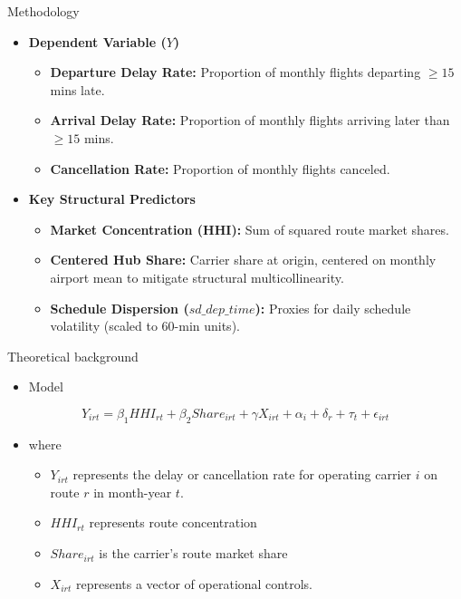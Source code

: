 \documentclass[t]{beamer}
\begin{document}
\begin{frame}{Methodology} %

    \begin{itemize}
        \item \textbf{Dependent Variable ($Y$)}
        \begin{itemize}
            \item \textbf{Departure Delay Rate:} Proportion of monthly flights departing $\geq 15$ mins late.
            \item \textbf{Arrival Delay Rate:} Proportion of monthly flights arriving later than $\geq 15$ mins.
            \item \textbf{Cancellation Rate:} Proportion of monthly flights canceled.
        \end{itemize}
        \addlinespace
        \item \textbf{Key Structural Predictors}
        \begin{itemize}
            \item \textbf{Market Concentration (HHI):} Sum of squared route market shares.
            \item \textbf{Centered Hub Share:} Carrier share at origin, centered on monthly airport mean to mitigate structural multicollinearity.
            \item \textbf{Schedule Dispersion ($sd\_dep\_time$):} Proxies for daily schedule volatility (scaled to 60-min units).
        \end{itemize}
    \end{itemize}
\end{frame}

\begin{frame}{Theoretical background} %
    \begin{itemize}
        \item Model
    \end{itemize}
    \begin{equation}
    Y_{irt} = \beta_1 HHI_{rt} + \beta_2 Share_{irt} + \gamma X_{irt} + \alpha_i + \delta_r + \tau_t + \epsilon_{irt}
    \end{equation}
    \begin{itemize}
        \item where 
        \begin{itemize}
            \item $Y_{irt}$ represents the delay or cancellation rate for operating carrier $i$ on route $r$ in month-year $t$.
            \item $HHI_{rt}$ represents route concentration
            \item $Share_{irt}$ is the carrier's route market share
            \item $X_{irt}$ represents a vector of operational controls.

        \end{itemize}
    \end{itemize}
\end{frame}
\end{document}
